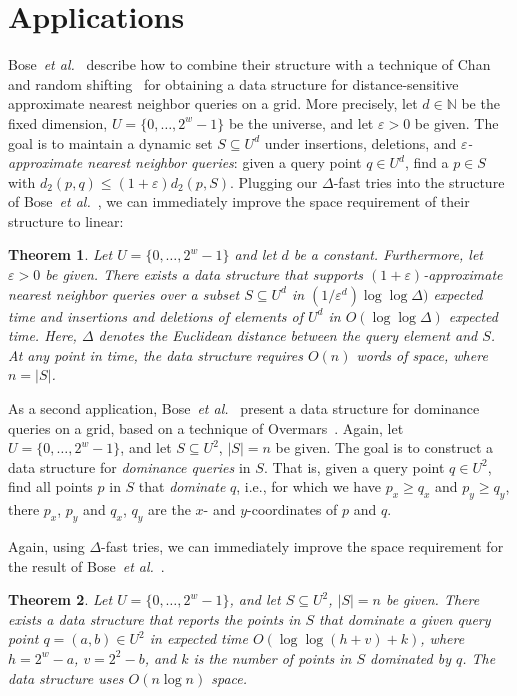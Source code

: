 \documentclass[a4paper,11pt]{article}
\newtheorem{theorem}{Theorem}[section]
\newcommand{\eps}{\varepsilon}
\newcommand{\N}{\mathbb{N}}
\newcommand{\etal}{\emph{et al.}\xspace}
\newcommand{\?}{\mskip1.5mu}
\begin{document}
\section{Applications}

Bose~\etal~\cite{BoseDoDuHoMo13} describe how to combine their structure
with a technique of Chan~\cite{Chan02} and random 
shifting~\cite[Chapter~11]{HarPeled11} for obtaining a data structure for 
distance-sensitive
approximate nearest neighbor queries on a grid.
More precisely, let $d \in \N$ be the fixed dimension, 
$U = \{0, \dots, 2^{w}-1\}$ be the universe, and
let $\eps > 0$ be given.
The goal is to maintain a dynamic set $S \subseteq U^d$ under
insertions, deletions, and \emph{$\eps$-approximate
nearest neighbor queries}: given a query point $q \in U^d$,
find a $p \in S$ with $d_2(p,q) \leq (1+\eps)d_2(p, S)$.
Plugging our $\Delta$-fast tries into the structure of
Bose~\etal~\cite[Theorem~9]{BoseDoDuHoMo13}, we can
immediately improve the space requirement of their structure to linear:
\begin{theorem}
Let $U = \{0, \dots, 2^w-1\}$ and let $d$ be a constant.
Furthermore, let $\eps > 0$ be given.
There exists a data structure that supports $(1+\eps)$-approximate
nearest neighbor queries over a subset $S \subseteq U^d$ in 
$(1/\eps^d)\log\log \Delta)$ expected time and insertions and deletions
of elements of $U^d$ in $O(\log\log \Delta)$ expected time.
Here, $\Delta$ denotes the Euclidean distance between the query element
and $S$. At any point in time, the data structure requires $O(n)$
words of space, where $n  = |S|$.
\end{theorem}

As a second application, Bose~\etal~\cite{BoseDoDuHoMo13}
present a data structure for dominance queries on a grid,
based on a technique of Overmars~\cite{Overmars88}.
Again, let $U = \{0, \dots, 2^w-1\}$, and let $S \subseteq U^2$,
$|S| = n$ be given. The goal is to construct a data structure
for \emph{dominance queries} in $S$. That is, given a query point
$q \in U^2$, find all points $p$ in $S$ that \emph{dominate} $q$,
i.e., for which we have $p_x \geq q_x$ and $p_y \geq q_y$, there
$p_x$, $p_y$ and $q_x$, $q_y$ are the $x$- and $y$-coordinates 
of $p$ and $q$.

Again, using $\Delta$-fast tries, we can immediately improve the
space requirement for the result of 
Bose~\etal~\cite[Theorem~10, Corollary~13]{BoseDoDuHoMo13}.

\begin{theorem}
Let $U = \{0, \dots, 2^w-1\}$, and let $S \subseteq U^2$, $|S|=n$
be given. There exists a data structure that reports the points in $S$
that dominate a given query point $q = (a,b) \in U^2$ in expected time
$O(\log\log(h+v) + k)$, where $h = 2^w - a$, $v = 2^2-b$, and $k$
is the number of points in $S$ dominated by $q$.
The data structure uses $O(n \log n)$ space.
\end{theorem}
\end{document}
